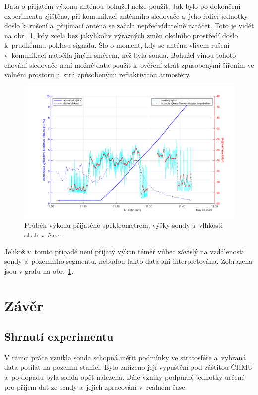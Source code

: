\documentclass[twoside]{ctuthesis}
\theoremstyle{plain}
\theoremstyle{definition}
\theoremstyle{note}
\begin{document}
	Data o přijatém výkonu anténou bohužel nelze použít. Jak bylo po dokončení experimentu zjištěno, při komunikaci anténního sledovače a~jeho řídicí jednotky došlo k~rušení a~přijímací anténa se začala nepředvídatelně natáčet. Toto je vidět na obr.~\ref{grah:p:alt:hum}, kdy zcela bez jakýhkoliv výrazných změn okolního prostředí došlo k~prudkémnu poklesu signálu. Šlo o moment, kdy se anténa vlivem rušení v~komunikaci natočila jiným směrem, než byla sonda. Bohužel vinou tohoto chování sledovače není možné data použít k~ověření ztrát způsobenými šířením ve volném prostoru a~ztrá způsobenými refraktivitou atmosféry. 

	\begin{figure}[hbtp]
		\centering
		\includegraphics[width=.9\textwidth]{Graphs/alt_hum_p_p_filt.pdf}
		\caption{Průběh výkonu přijatého spektrometrem, výšky sondy a~vlhkosti okolí v~čase}
		\label{grah:p:alt:hum}
	\end{figure}

	Jelikož v~tomto případě není přijatý výkon téměř vůbec závislý na vzdálenosti sondy a~pozemního segmentu, nebudou takto data ani interpretována. Zobrazena jsou v grafu na obr.~\ref{grah:p:alt:hum}.

	















	


\chapter{Závěr}
	\section{Shrnutí experimentu}
	V rámci práce vznikla sonda schopná měřit podmínky ve stratosféře a~vybraná data posílat na pozemní stanici. Bylo zařízeno její vypuštění pod záštitou ČHMÚ a~po dopadu byla sonda opět nalezena. Dále vzniky podpůrné jednotky určené pro příjem dat ze sondy a~jejich zpracování v~reálném čase.
\end{document}

